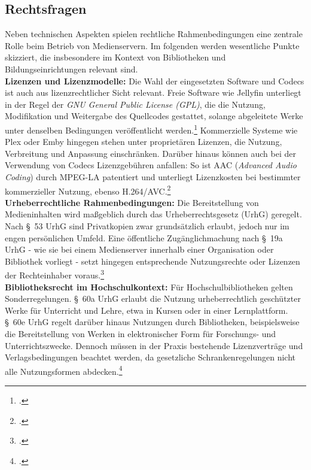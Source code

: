 \documentclass[12pt,a4paper]{report}
\begin{document}
  \subsection{Rechtsfragen}  
  Neben technischen Aspekten spielen rechtliche Rahmenbedingungen eine zentrale Rolle beim Betrieb von Medienservern.
  Im folgenden werden wesentliche Punkte skizziert, die insbesondere im Kontext von Bibliotheken und Bildungseinrichtungen relevant sind. 
  \\
  \newline
  \textbf{Lizenzen und Lizenzmodelle:}  
  Die Wahl der eingesetzten Software und Codecs ist auch aus lizenzrechtlicher Sicht relevant.  
  Freie Software wie Jellyfin unterliegt in der Regel der \emph{GNU General Public License (GPL)}, die die Nutzung, Modifikation und Weitergabe des Quellcodes gestattet, 
  solange abgeleitete Werke unter denselben Bedingungen veröffentlicht werden.\footcite[Vgl.][]{gnu_gplv3}  
  Kommerzielle Systeme wie Plex oder Emby hingegen stehen unter proprietären Lizenzen, die Nutzung, Verbreitung und Anpassung einschränken.  
  Darüber hinaus können auch bei der Verwendung von Codecs Lizenzgebühren anfallen: So ist AAC (\emph{Advanced Audio Coding}) durch MPEG-LA patentiert 
  und unterliegt Lizenzkosten bei bestimmter kommerzieller Nutzung, ebenso H.264/AVC.\footcite[Vgl.][]{wikipedia_mpegla}  
  \\
  \newline
  \textbf{Urheberrechtliche Rahmenbedingungen:}  
  Die Bereitstellung von Medieninhalten wird maßgeblich durch das Urheberrechtsgesetz (UrhG) geregelt.  
  Nach §~53 UrhG sind Privatkopien zwar grundsätzlich erlaubt, jedoch nur im engen persönlichen Umfeld.  
  Eine öffentliche Zugänglichmachung nach §~19a UrhG - wie sie bei einem Medienserver innerhalb einer Organisation oder Bibliothek vorliegt -
  setzt hingegen entsprechende Nutzungsrechte oder Lizenzen der Rechteinhaber voraus.\footcite[Vgl.][§§~53, 19a UrhG]{urhg2025}  
  \\
  \newline
  \textbf{Bibliotheksrecht im Hochschulkontext:}  
  Für Hochschulbibliotheken gelten Sonderregelungen.  
  §~60a UrhG erlaubt die Nutzung urheberrechtlich geschützter Werke für Unterricht und Lehre, etwa in Kursen oder in einer Lernplattform.  
  §~60e UrhG regelt darüber hinaus Nutzungen durch Bibliotheken, beispielsweise die Bereitstellung von Werken in elektronischer Form für Forschungs- und Unterrichtszwecke.  
  Dennoch müssen in der Praxis bestehende Lizenzverträge und Verlagsbedingungen beachtet werden, 
  da gesetzliche Schrankenregelungen nicht alle Nutzungsformen abdecken.\footcite[Vgl.][§§~60a, 60e UrhG]{urhg2025}  
\end{document}
